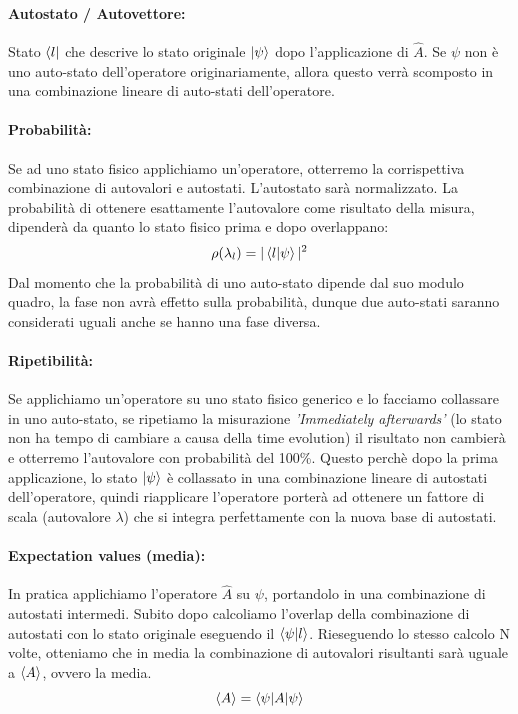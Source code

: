 \paragraph{Autostato / Autovettore:}
Stato $\bra{l}$ che descrive lo stato originale $\ket{\psi}$ dopo l'applicazione di $\hat{A}$. Se $\psi$ non è uno auto-stato dell'operatore originariamente, allora questo verrà scomposto in una combinazione lineare di auto-stati dell'operatore.

\paragraph{Probabilità:}
Se ad uno stato fisico applichiamo un'operatore, otterremo la corrispettiva combinazione di autovalori e autostati. L'autostato sarà normalizzato. La probabilità di ottenere esattamente l'autovalore come risultato della misura, dipenderà da quanto lo stato fisico prima e dopo overlappano:
$$\rho(\lambda_l) = |\braket{l|\psi}|^2$$
Dal momento che la probabilità di uno auto-stato dipende dal suo modulo quadro, la fase non avrà effetto sulla probabilità, dunque due auto-stati saranno considerati uguali anche se hanno una fase diversa.

\paragraph{Ripetibilità:}
Se applichiamo un'operatore su uno stato fisico generico e lo facciamo collassare in uno auto-stato, se ripetiamo la misurazione \textit{'Immediately afterwards'} (lo stato non ha tempo di cambiare a causa della time evolution) il risultato non cambierà e otterremo l'autovalore con probabilità del 100\%. Questo perchè dopo la prima applicazione, lo stato $\ket{\psi}$ è collassato in una combinazione lineare di autostati dell'operatore, quindi riapplicare l'operatore porterà ad ottenere un fattore di scala (autovalore $\lambda$) che si integra perfettamente con la nuova base di autostati.

\paragraph{Expectation values (media):}
In pratica applichiamo l'operatore $\hat{A}$ su $\psi$, portandolo in una combinazione di autostati intermedi. Subito dopo calcoliamo l'overlap della combinazione di autostati con lo stato originale eseguendo il $\braket{\psi|l}$. Rieseguendo lo stesso calcolo N volte, otteniamo che in media la combinazione di autovalori risultanti sarà uguale a $\braket{A}$, ovvero la media.
$$\braket{A} = \braket{\psi|A|\psi}$$

